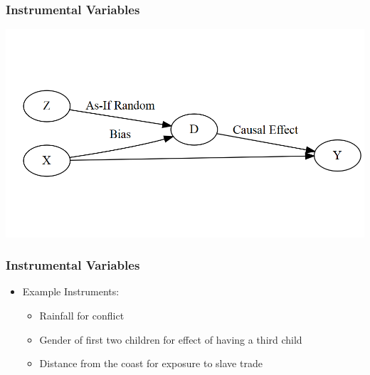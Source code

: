 \documentclass[xcolor=x11names,compress]{beamer}\usepackage[]{graphicx}\usepackage[]{color}
\makeatletter
\def\maxwidth{ %
  \ifdim\Gin@nat@width>\linewidth
    \linewidth
  \else
    \Gin@nat@width
  \fi
}
\newenvironment{knitrout}{}{} %
\renewcommand{\(}{\begin{columns}}
\renewcommand{\)}{\end{columns}}
\newcommand{\<}[1]{\begin{column}{#1}}
\renewcommand{\>}{\end{column}}
\makeatother
\begin{document}
\begin{frame}
\frametitle{Instrumental Variables}
\begin{knitrout}
\color{fgcolor}
\includegraphics[width=\maxwidth]{figure/dag4-1} 

\end{knitrout}
\end{frame}


\begin{frame}
\frametitle{Instrumental Variables}
\begin{itemize}
\item Example Instruments:
\begin{itemize}
\item Rainfall for conflict 
\item Gender of first two children for effect of having a third child
\item Distance from the coast for exposure to slave trade
\end{itemize}
\end{itemize}
\end{frame}
\end{document}
